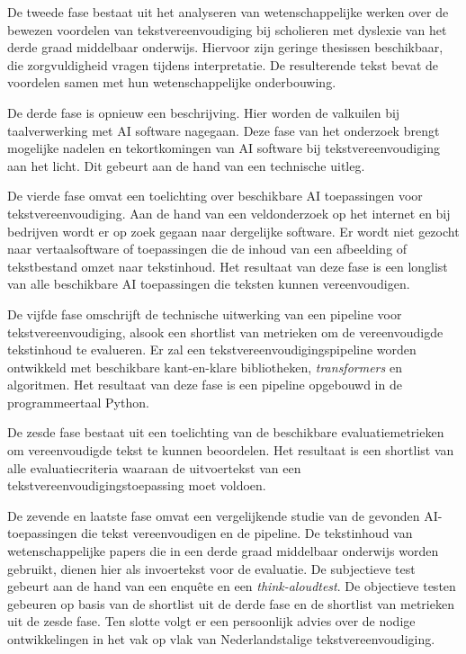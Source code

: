 De tweede fase bestaat uit het analyseren van wetenschappelijke werken over de bewezen voordelen van tekstvereenvoudiging bij scholieren met dyslexie van het derde graad middelbaar onderwijs. Hiervoor zijn geringe thesissen beschikbaar, die zorgvuldigheid vragen tijdens interpretatie. De resulterende tekst bevat de voordelen samen met hun wetenschappelijke onderbouwing.

De derde fase is opnieuw een beschrijving. Hier worden de valkuilen bij taalverwerking met AI software nagegaan. Deze fase van het onderzoek brengt mogelijke nadelen en tekortkomingen van AI software bij tekstvereenvoudiging aan het licht. Dit gebeurt aan de hand van een technische uitleg.

De vierde fase omvat een toelichting over beschikbare AI toepassingen voor tekstvereenvoudiging. Aan de hand van een veldonderzoek op het internet en bij bedrijven wordt er op zoek gegaan naar dergelijke software. Er wordt niet gezocht naar vertaalsoftware of toepassingen die de inhoud van een afbeelding of tekstbestand omzet naar tekstinhoud. Het resultaat van deze fase is een longlist van alle beschikbare AI toepassingen die teksten kunnen vereenvoudigen.

De vijfde fase omschrijft de technische uitwerking van een pipeline voor tekstvereenvoudiging, alsook een shortlist van metrieken om de vereenvoudigde tekstinhoud te evalueren. Er zal een tekstvereenvoudigingspipeline worden ontwikkeld met beschikbare kant-en-klare bibliotheken, \textit{transformers} en algoritmen. Het resultaat van deze fase is een pipeline opgebouwd in de programmeertaal Python. 

De zesde fase bestaat uit een toelichting van de beschikbare evaluatiemetrieken om vereenvoudigde tekst te kunnen beoordelen. Het resultaat is een shortlist van alle evaluatiecriteria waaraan de uitvoertekst van een tekstvereenvoudigingstoepassing moet voldoen.

De zevende en laatste fase omvat een vergelijkende studie van de gevonden AI-toepassingen die tekst vereenvoudigen en de pipeline. De tekstinhoud van wetenschappelijke papers die in een derde graad middelbaar onderwijs worden gebruikt, dienen hier als invoertekst voor de evaluatie. De subjectieve test gebeurt aan de hand van een enquête en een \textit{think-aloudtest}. De objectieve testen gebeuren op basis van de shortlist uit de derde fase en de shortlist van metrieken uit de zesde fase. Ten slotte volgt er een persoonlijk advies over de nodige ontwikkelingen in het vak op vlak van Nederlandstalige tekstvereenvoudiging.

